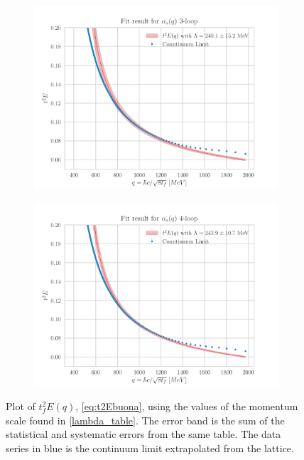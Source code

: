 \begin{figure}[hbt!]
    \begin{subfigure}{0.49\textwidth}
        \centering
        \includegraphics[width=1\textwidth]{results/End3.pdf}
    \end{subfigure}
    \begin{subfigure}{0.49\textwidth}
        \centering
        \includegraphics[width=1\textwidth]{results/End4.pdf}        
    \end{subfigure}
    \caption{Plot of $t_f^2E(q)$, \cref{eq:t2Ebuona}, using the values of the momentum scale found in \cref{lambda_table}. The error band is the sum of the statistical and systematic errors from the same table. The data series in blue is the continuum limit extrapolated from the lattice.}
    \label{fig:end}
\end{figure}

